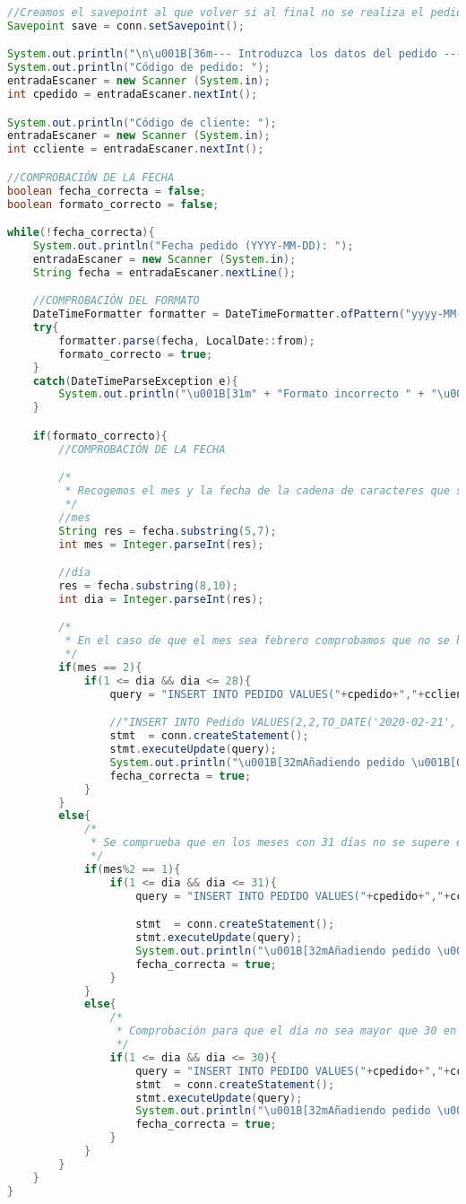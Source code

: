 \begin{lstlisting}[language=Java]
//Creamos el savepoint al que volver si al final no se realiza el pedido
Savepoint save = conn.setSavepoint();

System.out.println("\n\u001B[36m--- Introduzca los datos del pedido ---\u001B[0m");
System.out.println("Código de pedido: ");
entradaEscaner = new Scanner (System.in);
int cpedido = entradaEscaner.nextInt();

System.out.println("Código de cliente: ");
entradaEscaner = new Scanner (System.in);
int ccliente = entradaEscaner.nextInt();

//COMPROBACIÓN DE LA FECHA
boolean fecha_correcta = false;
boolean formato_correcto = false;

while(!fecha_correcta){
	System.out.println("Fecha pedido (YYYY-MM-DD): ");
	entradaEscaner = new Scanner (System.in);
	String fecha = entradaEscaner.nextLine();

	//COMPROBACIÓN DEL FORMATO
	DateTimeFormatter formatter = DateTimeFormatter.ofPattern("yyyy-MM-dd");
	try{
		formatter.parse(fecha, LocalDate::from);
		formato_correcto = true;
	}
	catch(DateTimeParseException e){
		System.out.println("\u001B[31m" + "Formato incorrecto " + "\u001B[0m");
	}

	if(formato_correcto){
	  	//COMPROBACIÓN DE LA FECHA

	  	/*
	  	 * Recogemos el mes y la fecha de la cadena de caracteres que se ha pasado para ver si son correctos
	  	 */
	  	//mes
	  	String res = fecha.substring(5,7);
	  	int mes = Integer.parseInt(res);

	  	//día
		res = fecha.substring(8,10);
	  	int dia = Integer.parseInt(res);

		/*
		 * En el caso de que el mes sea febrero comprobamos que no se haya introducido un día mas allá del 28
		 */
	  	if(mes == 2){
	  		if(1 <= dia && dia <= 28){
				query = "INSERT INTO PEDIDO VALUES("+cpedido+","+ccliente + ",TO_DATE('"+fecha+"','YYYY-MM-DD'))";

				//"INSERT INTO Pedido VALUES(2,2,TO_DATE('2020-02-21','YYYY-MM-DD'))";
				stmt  = conn.createStatement();
				stmt.executeUpdate(query);
				System.out.println("\u001B[32mAñadiendo pedido \u001B[0m");
				fecha_correcta = true;
			}
		}
		else{
			/*
			 * Se comprueba que en los meses con 31 días no se supere ese número
			 */
			if(mes%2 == 1){
				if(1 <= dia && dia <= 31){
					query = "INSERT INTO PEDIDO VALUES("+cpedido+","+ccliente + ",TO_DATE('"+fecha+"','YYYY-MM-DD'))";

					stmt  = conn.createStatement();
					stmt.executeUpdate(query);
					System.out.println("\u001B[32mAñadiendo pedido \u001B[0m");
					fecha_correcta = true;
				}
			}
			else{
				/*
				 * Comprobación para que el día no sea mayor que 30 en los meses con ese número de días
				 */
				if(1 <= dia && dia <= 30){
					query = "INSERT INTO PEDIDO VALUES("+cpedido+","+ccliente + ",TO_DATE('"+fecha+"','YYYY-MM-DD'))";
					stmt  = conn.createStatement();
					stmt.executeUpdate(query);
  					System.out.println("\u001B[32mAñadiendo pedido \u001B[0m");
  					fecha_correcta = true;
  				}
  			}
		}
	}
}
\end{lstlisting}

